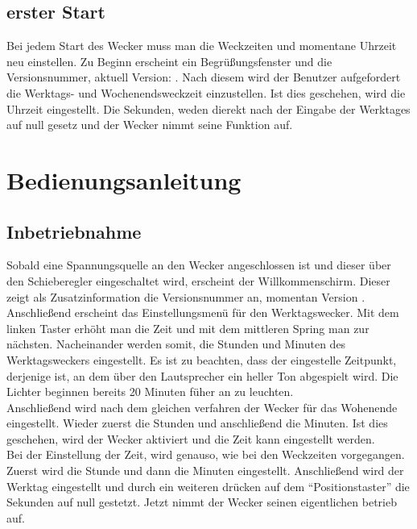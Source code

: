 \documentclass[12pt,a4paper,titlepage,headinclude]{scrartcl}
\numberwithin{equation}{subsection}
\begin{document}
\subsection{erster Start}
Bei jedem Start des Wecker muss man die Weckzeiten und momentane Uhrzeit neu einstellen.
Zu Beginn erscheint ein Begrüßungsfenster und die Versionsnummer, aktuell Version: \titel.
Nach diesem wird der Benutzer aufgefordert die Werktags- und Wochenendsweckzeit einzustellen.
Ist dies geschehen, wird die Uhrzeit eingestellt.
Die Sekunden, weden dierekt nach der Eingabe der Werktages auf null gesetz und der Wecker nimmt seine Funktion auf.


\newpage
\section{Bedienungsanleitung}
\label{sec:Bedienungsanleitung}

\subsection{Inbetriebnahme}
\label{sec:inbetriebname}
Sobald eine Spannungsquelle an den Wecker angeschlossen ist und dieser über den Schieberegler eingeschaltet wird, erscheint der Willkommenschirm.
Dieser zeigt als Zusatzinformation die Versionsnummer an, momentan Version \titel.
Anschließend erscheint das Einstellungsmenü für den Werktagswecker.
Mit dem linken Taster erhöht man die Zeit und mit dem mittleren Spring man zur nächsten.
Nacheinander werden somit, die Stunden und Minuten des Werktagsweckers eingestellt.
Es ist zu beachten, dass der eingestelle Zeitpunkt, derjenige ist, an dem über den Lautsprecher ein heller Ton abgespielt wird.
Die Lichter beginnen bereits 20 Minuten füher an zu leuchten.\\
Anschließend wird nach dem gleichen verfahren der Wecker für das Wohenende eingestellt.
Wieder zuerst die Stunden und anschließend die Minuten.
Ist dies geschehen, wird der Wecker aktiviert und die Zeit kann eingestellt werden.\\
Bei der Einstellung der Zeit, wird genauso, wie bei den Weckzeiten vorgegangen.
Zuerst wird die Stunde und dann die Minuten eingestellt.
Anschließend wird der Werktag eingestellt und durch ein weiteren drücken auf dem "`Positionstaster"' die Sekunden auf null gestetzt.
Jetzt nimmt der Wecker seinen eigentlichen betrieb auf.
\end{document}

